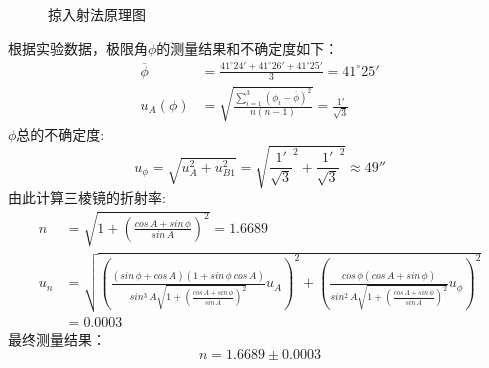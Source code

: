 \documentclass[12pt]{article}
\begin{document}
\begin{figure}[H]
    \centering
    \caption{掠入射法原理图}
\end{figure}

根据实验数据，极限角$\phi$的测量结果和不确定度如下：\\
\begin{equation*}
    \begin{aligned}
        \overline{\phi} &= \frac{41^{\circ}24' + 41^{\circ}26' + 41^{\circ}25'}{3} = 41^{\circ}25' \\
        u_A(\phi) &= \sqrt{\frac{\sum_{i=1}^3(\phi_i-\overline{\phi})^2}{n(n-1)}} = \frac{1'}{\sqrt{3}} 
    \end{aligned}
\end{equation*}
\quad $\phi$总的不确定度:
\begin{equation*}
    u_\phi = \sqrt{u_A^2 + u_{B1}^2} = \sqrt{\frac{1'}{\sqrt{3}}^2 + \frac{1'}{\sqrt{3}}^2} \approx 49'' 
\end{equation*}
\quad 由此计算三棱镜的折射率:
\begin{equation*}
\begin{aligned}
 n&=\sqrt{1+(\frac{cos\, A+sin\, \phi}{sin\, A})^2}=1.6689 \\
 u_n&=\sqrt{(\frac{(sin\, \phi+cos\,A)(1+sin\,\phi\ cos\,A)}{sin^3 \,A\sqrt{1+(\frac{cos\, A+sin\, \phi}{sin\, A})^2}}u_A)^2+(\frac{cos\,\phi(cos\,A+sin\,\phi)}{sin^2\,A\sqrt{1+(\frac{cos\, A+sin\, \phi}{sin\, A})^2}}u_\phi)^2}\\
    &=0.0003
\end{aligned}
\end{equation*}
\quad 最终测量结果：
\begin{equation}
    n = 1.6689 \pm 0.0003
\end{equation}
\end{document}
